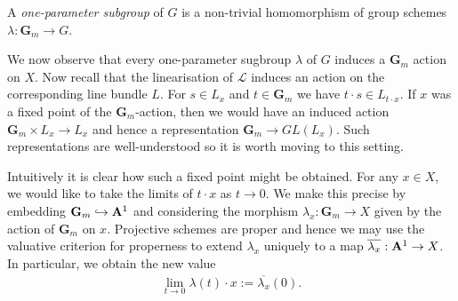 \documentclass[12pt]{ociamthesis}  %
\begin{document}
\begin{definition}
  A \emph{one-parameter subgroup} of $G$ is a non-trivial homomorphism
  of group schemes $\lambda : \mathbf G_m \to G$.
\end{definition}

We now observe that every one-parameter sugbroup $\lambda$ of $G$
induces a $\mathbf G_m$ action on $X$. Now recall that the
linearisation of $\mathscr L$ induces an action on the corresponding
line bundle $L$. For $s\in L_x$ and $t\in \mathbf G_m$ we have
$t\cdot s\in L_{t\cdot x}$. If $x$ was a fixed point of the
$\mathbf G_m$-action, then we would have an induced action
$\mathbf G_m\times L_x \to L_x$ and hence a representation
$\mathbf G_m\to GL(L_x)$. Such representations are well-understood
so it is worth moving to this setting.

Intuitively it is clear how such a fixed point might be obtained.
For any $x\in X$, we would like to take the limits of $t\cdot x$
as $t\to 0$. We make this precise
by embedding $\mathbf G_m\hookrightarrow\mathbf A^1$ and
considering the morphism $\lambda_x : \mathbf G_m \to X$ given by
the action of $\mathbf G_m$ on $x$.
Projective schemes are proper and hence we may use the valuative
criterion for properness to extend $\lambda_x$ uniquely to a map
$\overline{\lambda_x} : \mathbf{A}^{1}_{} \to X$.
In particular, we obtain the new value
\begin{align*}
  \lim_{t\to 0}\lambda(t)\cdot x := \overline{\lambda_x}(0).
\end{align*}
\end{document}
